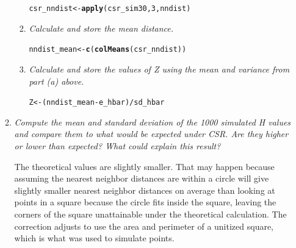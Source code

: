 \documentclass{article}\usepackage[]{graphicx}\usepackage[]{color}
\makeatletter
\newcommand{\hlnum}[1]{\textcolor[rgb]{0.686,0.059,0.569}{#1}}%
\newcommand{\hlopt}[1]{\textcolor[rgb]{0,0,0}{#1}}%
\newcommand{\hlstd}[1]{\textcolor[rgb]{0.345,0.345,0.345}{#1}}%
\newcommand{\hlkwb}[1]{\textcolor[rgb]{0.69,0.353,0.396}{#1}}%
\newcommand{\hlkwd}[1]{\textcolor[rgb]{0.737,0.353,0.396}{\textbf{#1}}}%
\newenvironment{kframe}{%
 \def\at@end@of@kframe{}%
 \ifinner\ifhmode%
  \def\at@end@of@kframe{\end{minipage}}%
  \begin{minipage}{\columnwidth}%
 \fi\fi%
 \def\FrameCommand##1{\hskip\@totalleftmargin \hskip-\fboxsep
 \colorbox{shadecolor}{##1}\hskip-\fboxsep
     \hskip-\linewidth \hskip-\@totalleftmargin \hskip\columnwidth}%
 \MakeFramed {\advance\hsize-\width
   \@totalleftmargin\z@ \linewidth\hsize
   \@setminipage}}%
 {\par\unskip\endMakeFramed%
 \at@end@of@kframe}
\newenvironment{knitrout}{}{} %
\makeatother
\begin{document}
\begin{enumerate}
\begin{enumerate}
\begin{enumerate}
\begin{knitrout}\footnotesize
{}\color{fgcolor}\begin{kframe}
\begin{alltt}
\hlstd{csr_nndist} \hlkwb{<-} \hlkwd{apply}\hlstd{(csr_sim30,}\hlnum{3}\hlstd{,nndist)}
\end{alltt}
\end{kframe}
\end{knitrout}

\item %
{\it Calculate and store the mean distance.}

\begin{knitrout}\footnotesize
{}\color{fgcolor}\begin{kframe}
\begin{alltt}
\hlstd{nndist_mean} \hlkwb{<-} \hlkwd{c}\hlstd{(}\hlkwd{colMeans}\hlstd{(csr_nndist))}
\end{alltt}
\end{kframe}
\end{knitrout}

\item %
{\it Calculate and store the values of Z using the mean and variance from part (a) above.}

\begin{knitrout}\footnotesize
{}\color{fgcolor}\begin{kframe}
\begin{alltt}
\hlstd{Z} \hlkwb{<-} \hlstd{(nndist_mean} \hlopt{-} \hlstd{e_hbar)}\hlopt{/}\hlstd{sd_hbar}
\end{alltt}
\end{kframe}
\end{knitrout}
\end{enumerate}
\newpage

\item %
{\it Compute the mean and standard deviation of the 1000 simulated H values and compare them to what would be expected under CSR. Are they higher or lower than expected? What could explain this result?}

The theoretical values are slightly smaller. That may happen because assuming the nearest neighbor distances are within a circle will give slightly smaller nearest neighbor distances on average than looking at points in a square because the circle fits inside the square, leaving the corners of the square unattainable under the theoretical calculation. The correction adjusts to use the area and perimeter of a unitized square, which is what was used to simulate points.


\end{enumerate}
\end{enumerate}
\end{document}
